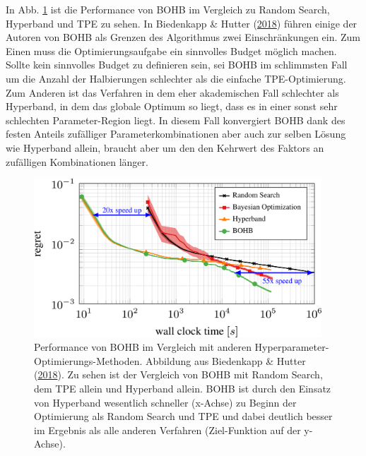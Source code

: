 \documentclass[
  12pt,
]{book}
\begin{document}
In Abb. \ref{fig:bohb} ist die Performance von BOHB im Vergleich zu Random Search, Hyperband und TPE zu sehen. In Biedenkapp \& Hutter (\protect\hyperlink{ref-biedenkappAutoMLBOHBRobust2018}{2018}) führen einige der Autoren von BOHB als Grenzen des Algorithmus zwei Einschränkungen ein. Zum Einen muss die Optimierungsaufgabe ein sinnvolles Budget möglich machen. Sollte kein sinnvolles Budget zu definieren sein, sei BOHB im schlimmsten Fall um die Anzahl der Halbierungen schlechter als die einfache TPE-Optimierung.
Zum Anderen ist das Verfahren in dem eher akademischen Fall schlechter als Hyperband, in dem das globale Optimum so liegt, dass es in einer sonst sehr schlechten Parameter-Region liegt. In diesem Fall konvergiert BOHB dank des festen Anteils zufälliger Parameterkombinationen aber auch zur selben Lösung wie Hyperband allein, braucht aber um den den Kehrwert des Faktors an zufälligen Kombinationen länger.





\begin{figure}

{\centering \includegraphics[width=0.96\textwidth]{../imgs/bohb} 

}

\caption[Performance von BOHB.]{Performance von BOHB im Vergleich mit anderen Hyperparameter-Optimierungs-Methoden. Abbildung aus Biedenkapp \& Hutter (\protect\hyperlink{ref-biedenkappAutoMLBOHBRobust2018}{2018}). Zu sehen ist der Vergleich von BOHB mit Random Search, dem TPE allein und Hyperband allein. BOHB ist durch den Einsatz von Hyperband wesentlich schneller (x-Achse) zu Beginn der Optimierung als Random Search und TPE und dabei deutlich besser im Ergebnis als alle anderen Verfahren (Ziel-Funktion auf der y-Achse).}\label{fig:bohb}
\end{figure}
\end{document}
